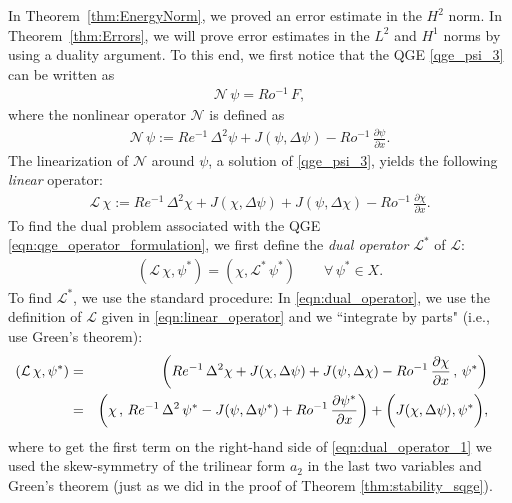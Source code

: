 In Theorem~\ref{thm:EnergyNorm}, we proved an error estimate in the $H^2$ norm.
In Theorem~\ref{thm:Errors}, we will prove error estimates in the $L^2$ and $H^1$ norms by using a duality argument.
To this end, we first notice that the QGE \eqref{qge_psi_3} can be written as
\begin{eqnarray}
\mathcal{N} \, \psi
= Ro^{-1} \, F ,
\label{eqn:qge_operator_formulation}
\end{eqnarray}
where the nonlinear operator $\mathcal{N}$ is defined as
\begin{eqnarray}
\mathcal{N} \, \psi
:= Re^{-1} \, \Delta^2 \psi
+ J(\psi , \Delta \psi)
- Ro^{-1} \, \frac{\partial \psi}{\partial x} .
\label{eqn:nonlinear_operator}
\end{eqnarray}
The linearization of $\mathcal{N}$ around $\psi$, a solution of \eqref{qge_psi_3}, yields the following \emph{linear} operator:
\begin{eqnarray}
\mathcal{L} \, \chi
:= Re^{-1} \, \Delta^2 \chi
+ J(\chi , \Delta \psi)
+ J(\psi, \Delta \chi)
- Ro^{-1} \, \frac{\partial \chi}{\partial x} .
\label{eqn:linear_operator}
\end{eqnarray}
To find the dual problem associated with the QGE \eqref{eqn:qge_operator_formulation}, we first define the \emph{dual operator} $\mathcal{L}^*$ of $\mathcal{L}$:
\begin{eqnarray}
(\mathcal{L} \, \chi , \psi^*)
= ( \chi , \mathcal{L}^* \, \psi^*)
\qquad
\forall \, \psi^* \in X .
\label{eqn:dual_operator}
\end{eqnarray}
To find $\mathcal{L}^*$, we use the standard procedure:
In \eqref{eqn:dual_operator}, we use the definition of $\mathcal{L}$ given in \eqref{eqn:linear_operator} and we ``integrate by parts" (i.e., use Green's theorem):
\begin{eqnarray}
\hspace*{-0.4cm}
(\mathcal{L} \, \chi , \psi^*)
&=& \left(
Re^{-1} \, \Delta^2 \chi
+ J(\chi , \Delta \psi)
+ J(\psi, \Delta \chi)
- Ro^{-1} \, \frac{\partial \chi}{\partial x}
\, , \, \psi^*
\right)
\nonumber \\
&=& \left(
\chi \, , \,
Re^{-1} \, \Delta^2 \, \psi^*
- J(\psi , \Delta \psi^* )
+ Ro^{-1} \, \frac{\partial \psi^*}{\partial x}
\right)
+ \biggl( J(\chi , \Delta \psi) , \psi^* \biggr) ,
\label{eqn:dual_operator_1}
\end{eqnarray}
where to get the first term on the right-hand side of \eqref{eqn:dual_operator_1} we used the skew-symmetry of the trilinear form $a_2$ in the last two variables and Green's theorem (just as we did in the proof of Theorem \ref{thm:stability_sqge}).
